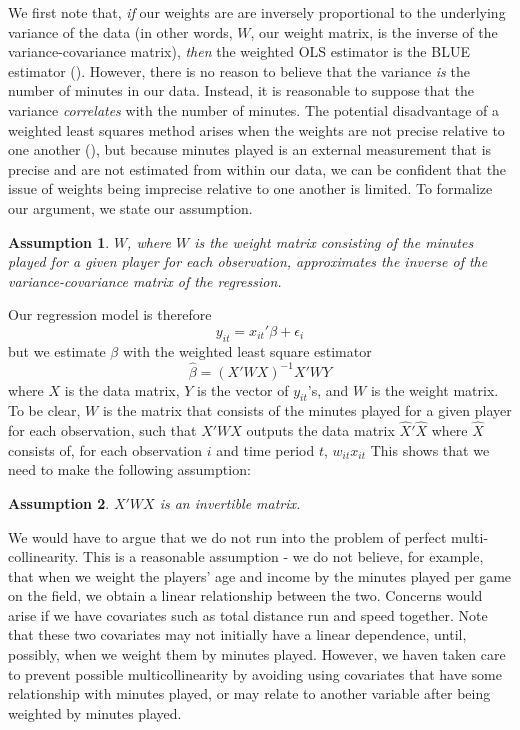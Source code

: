\documentclass[12pt]{article}
\newtheorem{assumption}{Assumption}
\begin{document}
	We first note that, \emph{if} our weights are are inversely proportional to the underlying variance of the data (in other words, $W$, our weight matrix, is the inverse of the variance-covariance matrix), \emph{then} the weighted OLS estimator is the BLUE estimator (\cite{aitken_iv.least_1936}). However, there is no reason to believe that the variance \emph{is} the number of minutes in our data. Instead, it is reasonable to suppose that the variance \emph{correlates} with the number of minutes. The potential disadvantage of a weighted least squares method arises when the weights are not precise relative to one another (\cite{carroll_transformation_1988}), but because minutes played is an external measurement that is precise and are not estimated from within our data, we can be confident that the issue of weights being imprecise relative to one another is limited. To formalize our argument, we state our assumption.
	
	\begin{assumption}
		$W$, where $W$ is the weight matrix consisting of the minutes played for a given player for each observation, approximates the inverse of the variance-covariance matrix of the regression.
	\end{assumption}
	
	Our regression model is therefore \[
	y_{it} = x_{it}'\beta + \epsilon_i
	\] but we estimate $\beta$ with the weighted least square estimator \[
	\hat{\beta} = \left(X'WX\right)^{-1}X'WY
	\] where $X$ is the data matrix, $Y$ is the vector of $y_{it}$'s, and $W$ is the weight matrix. To be clear, $W$ is the matrix that consists of the minutes played for a given player for each observation, such that $X'WX$ outputs the data matrix $\hat{X}'\hat{X}$ where $\hat{X}$ consists of, for each observation $i$ and time period $t$, $w_{it}x_{it}$ This shows that we need to make the following assumption:
	
	\begin{assumption}
		$X'WX$ is an invertible matrix.
	\end{assumption}

	We would have to argue that we do not run into the problem of perfect multi-collinearity. This is a reasonable assumption - we do not believe, for example, that when we weight the players' age and income by the minutes played per game on the field, we obtain a linear relationship between the two. Concerns would arise if we have covariates such as total distance run and speed together. Note that these two covariates may not initially have a linear dependence, until, possibly, when we weight them by minutes played. However, we haven taken care to prevent possible multicollinearity by avoiding using covariates that have some relationship with minutes played, or may relate to another variable after being weighted by minutes played.
	
\end{document}

